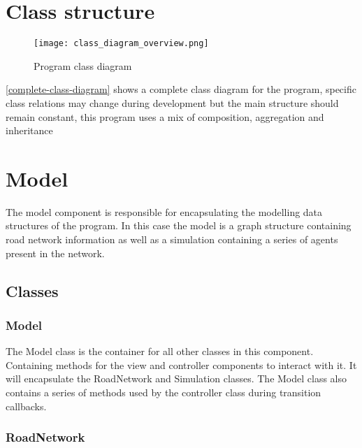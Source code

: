 \section{Class structure}

    \begin{figure}
        \centering
        \texttt{[image: class\_diagram\_overview.png]}
        \caption{Program class diagram}
        \label{complete-class-diagram}
    \end{figure}

    \autoref{complete-class-diagram} shows a complete class diagram for the program, specific class relations may change during development but the main structure should remain constant, this program uses a mix of composition, aggregation and inheritance

\section{Model}

    The model component is responsible for encapsulating the modelling data structures of the program. In this case the model is a graph structure containing road network information as well as a simulation containing a series of agents present in the network.

    \subsection{Classes}

        \subsubsection{Model}

            The Model class is the container for all other classes in this component. Containing methods for the view and controller components to interact with it. It will encapsulate the RoadNetwork and Simulation classes. The Model class also contains a series of methods used by the controller class during transition callbacks.


        \subsubsection{RoadNetwork}

